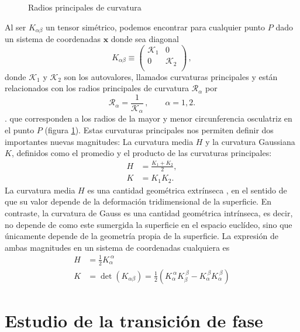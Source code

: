 \begin{figure}[h]
\centering
 \resizebox{\columnwidth}{!}{}
\caption{Radios principales de curvatura}\label{radios_curvatura-fig}
\end{figure}

Al ser $K_{\alpha\beta}$ un tensor simétrico, podemos encontrar para cualquier
punto $P$ dado un sistema de coordenadas $\mathbf{x}$ donde sea diagonal
\begin{equation*}
K_{\alpha\beta}\equiv\left(\begin{array}{cc}
\mathcal{K}_1 & 0\\
0 & \mathcal{K}_2\\
\end{array}\right)\, ,
\end{equation*} 
donde $\mathcal{K}_1$ y $\mathcal{K}_2$ son los autovalores, llamados
curvaturas principales y están relacionados con los radios principales
de curvatura $\mathcal{R}_{\alpha}$ por
\begin{equation*}
\mathcal{R}_{\alpha}=\frac{1}{\mathcal{K}_{\alpha}} \, , \qquad \alpha=1,2.
\end{equation*}.
que corresponden a los radios de la mayor y menor circunferencia osculatriz en
el punto $P$ (figura \ref{radios_curvatura-fig}).
Estas curvaturas principales nos permiten definir dos importantes nuevas magnitudes:
La curvatura media $H$ y la curvatura Gaussiana $K$, definidos como el
promedio y el producto de las curvaturas principales:
\begin{align}
H&=\frac{K_1+K_2}{2},\\
K&=K_1K_2.
\end{align}
La curvatura media $H$ es una cantidad geométrica extrínseca \cite{LuisLinares}, en el sentido de
que su valor depende de la deformación tridimensional de la superficie. En
contraste, la curvatura de Gauss es una cantidad geométrica intrínseca, es
decir, no depende de como este sumergida la superficie en el espacio euclídeo,
sino que únicamente depende de la geometría propia de la superficie. La
expresión de ambas magnitudes en un sistema de coordenadas cualquiera es
\begin{align}
H&= \frac{1}{2}K_{\alpha}^{\ \alpha}\label{curvatura_media}\\
K&= \det(K_{\alpha\beta})=\frac{1}{2}(K_{\alpha}^{\ \alpha}K_{\beta}^{\ \beta}-K_{\alpha}^{\ \beta}K_{\alpha}^{\ \beta})\label{curvatura_gaussiana}
\end{align}
\section{Estudio de la transición de fase}

